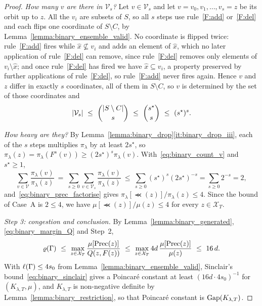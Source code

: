 \documentclass[aos]{imsart}%
\DeclarePairedDelimiter{\abs}{\lvert}{\rvert}
\newcommand{\ambientspace}[0]{\mathcal{X}}
\theoremstyle{plain}
\theoremstyle{definition}
\begin{document}
\begin{proof}
        \emph{How many $v$ are there in $\mathcal{V}_s$?} Let
        $v\in\mathcal{V}_s$ and let $v=v_0,v_1,\dots,v_s=z$ be its orbit up to
        $z$. All the $v_i$ are subsets of $S$, so all $s$ steps use
        rule~\ref{F:add} or~\ref{F:del} and each flips one coordinate of
        $S\setminus C$, by Lemma~\ref{lemma:binary_ensemble_valid}. No
        coordinate is flipped twice: rule~\ref{F:add} fires while
        $\hat x\not\subseteq v_i$ and adds an element of $\hat x$, which no
        later application of rule~\ref{F:del} can remove, since
        rule~\ref{F:del} removes only elements of $v_i\setminus\hat x$; and
        once rule~\ref{F:del} has fired we have $\hat x\subseteq v_i$, a
        property preserved by further applications of rule~\ref{F:del}, so
        rule~\ref{F:add} never fires again. Hence $v$ and $z$ differ in exactly
        $s$ coordinates, all of them in $S\setminus C$, so $v$ is determined by
        the set of those coordinates and
        \begin{equation}
            \label{eq:binary_count_v}
            \abs{\mathcal{V}_s}\ \leq\ \binom{\abs{S\setminus C}}{s}
            \ \leq\ \binom{s^{\star}}{s}\ \leq\ (s^{\star})^{s}.
        \end{equation}

        \emph{How heavy are they?} By
        Lemma~\ref{lemma:binary_drop}\ref{it:binary_drop_iii}, each of the $s$
        steps multiplies $\pi_\lambda$ by at least $2s^{\star}$, so
        $\pi_\lambda(z)=\pi_\lambda(F^{s}(v))\geq(2s^{\star})^{s}
        \pi_\lambda(v)$. With~\eqref{eq:binary_count_v} and $s^{\star}\geq1$,
        \begin{equation}
            \label{eq:binary_prec_geom}
            \sum_{v\in\mathcal{V}}\frac{\pi_\lambda(v)}{\pi_\lambda(z)}
            \ =\ \sum_{s\geq0}\sum_{v\in\mathcal{V}_s}
            \frac{\pi_\lambda(v)}{\pi_\lambda(z)}
            \ \leq\ \sum_{s\geq0}(s^{\star})^{s}(2s^{\star})^{-s}
            =\sum_{s\geq0}2^{-s}=2 ,
        \end{equation}
        and~\eqref{eq:binary_prec_factorise} gives
        $\pi_\lambda[\Prec(z)]/\pi_\lambda(z)\leq4$. Since the bound of
        Case~A is $2\leq4$, we have
        $\mu[\Prec(z)]/\mu(z)\leq4$ for every $z\in\ambientspace_T$.

        \emph{Step 3: congestion and conclusion.} By
        Lemma~\ref{lemma:binary_generated}, \eqref{eq:binary_margin_Q} and
        Step~2,
        \begin{equation*}
            \Cong(\Gamma)\ \leq\
            \max_{z\in\ambientspace_T}\frac{\mu[\Prec(z)]}{Q(z,F(z))}
            \ \leq\ \max_{z\in\ambientspace_T}4d\,
            \frac{\mu[\Prec(z)]}{\mu(z)}\ \leq\ 16\,d .
        \end{equation*}
        With $\ell(\Gamma)\leq4s_0$ from
        Lemma~\ref{lemma:binary_ensemble_valid}, Sinclair's
        bound~\eqref{eq:binary_sinclair} gives a Poincar\'e constant at least
        $(16d\cdot4s_0)^{-1}$ for $(K_{\lambda,T},\mu)$, and $K_{\lambda,T}$ is
        non-negative definite by
        Lemma~\ref{lemma:binary_restriction}, so that Poincar\'e constant is
        $\mathrm{Gap}(K_{\lambda,T})$.
    \end{proof}
\end{document}

